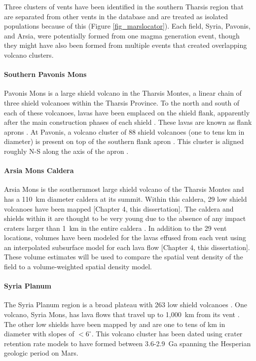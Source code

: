 Three clusters of vents have been identified in the southern Tharsis region that are separated from other vents in the database and are treated as isolated populations because of this (Figure \ref{fig_marslocator}). Each field, Syria, Pavonis, and Arsia, were potentially formed from one magma generation event, though they might have also been formed from multiple events that created overlapping volcano clusters.

\paragraph{Southern Pavonis Mons}
Pavonis Mons is a large shield volcano in the Tharsis Montes, a linear chain of three shield volcanoes within the Tharsis Province. To the north and south of each of these volcanoes, lavas have been emplaced on the shield flank, apparently after the main construction phases of each shield \citep{bleacher2007tharsis}. These lavas are known as flank aprons \citep{bleacher2007tharsis}. At Pavonis, a volcano cluster of 88 shield volcanoes (one to tens km in diameter) is present on top of the southern flank apron \citep{bleacher2009spatial}. This cluster is aligned roughly N-S along the axis of the apron \citep{bleacher2009spatial}.


\paragraph{Arsia Mons Caldera}
Arsia Mons is the southernmost large shield volcano of the Tharsis Montes and has a 110~km diameter caldera at its summit. Within this caldera, 29 low shield volcanoes have been mapped [Chapter 4, this dissertation]. The caldera and shields within it are thought to be very young due to the absence of any impact craters larger than 1~km in the entire caldera \citep{crumpler1996calderas}. In addition to the 29 vent locations, volumes have been modeled for the lavas effused from each vent using an interpolated subsurface model for each lava flow [Chapter 4, this dissertation]. These volume estimates will be used to compare the spatial vent density of the field to a volume-weighted spatial density model.

\paragraph{Syria Planum}
The Syria Planum region is a broad plateau with 263 low shield volcanoes \citep{richardson2013volcanic}. One volcano, Syria Mons, has lava flows that travel up to 1,000~km from its vent \citep{baptista2008swarm}. The other low shields have been mapped by \citet{richardson2013volcanic} and are one to tens of km in diameter with slopes of $<6^{\circ}$. This volcano cluster has been dated using crater retention rate models to have formed between 3.6-2.9~Ga spanning the Hesperian geologic period on Mars.

